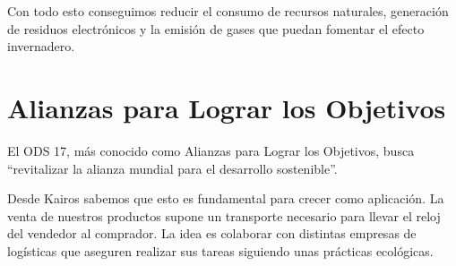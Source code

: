 	Con todo esto conseguimos reducir el consumo de recursos naturales, generación de residuos electrónicos y la emisión de gases que puedan fomentar el efecto invernadero.
	

\section{Alianzas para Lograr los Objetivos}

	El ODS 17, más conocido como Alianzas para Lograr los Objetivos, busca ``revitalizar la alianza mundial para el desarrollo sostenible''.
	
	Desde Kairos sabemos que esto es fundamental para crecer como aplicación. La venta de nuestros productos supone un transporte necesario para llevar el reloj del vendedor al comprador. La idea es colaborar con distintas empresas de logísticas que aseguren realizar sus tareas siguiendo unas prácticas ecológicas.
	


